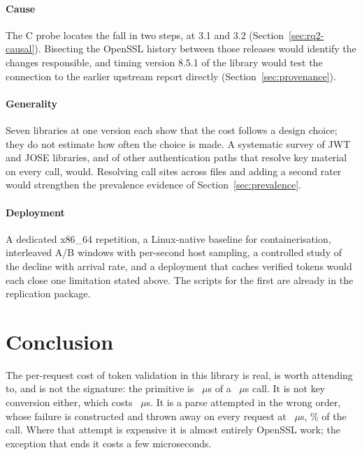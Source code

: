 \documentclass[preprint,12pt,authoryear]{elsarticle}
\begin{document}
\paragraph{Cause} The C probe locates the fall in two steps, at 3.1 and 3.2
(Section~\ref{sec:rq2-causal}). Bisecting the OpenSSL history between those
releases would identify the changes responsible, and timing version 8.5.1 of
the library would test the connection to the earlier upstream report directly
(Section~\ref{sec:provenance}).

\paragraph{Generality} Seven libraries at one version each show that the cost
follows a design choice; they do not estimate how often the choice is made. A
systematic survey of JWT and JOSE libraries, and of other authentication paths
that resolve key material on every call, would. Resolving call sites across
files and adding a second rater would strengthen the prevalence evidence of
Section~\ref{sec:prevalence}.

\paragraph{Deployment} A dedicated x86\_64 repetition, a Linux-native baseline
for containerisation, interleaved A/B windows with per-second host sampling, a
controlled study of the decline with arrival rate, and a deployment that caches
verified tokens would each close one limitation stated above. The scripts for
the first are already in the replication package.

\section{Conclusion}\label{sec:conclusion}

The per-request cost of token validation in this library is real, is worth
attending to, and is not the signature: the primitive is \HostHmacString~$\mu$s
of a \HostJwtString~$\mu$s call. It is not key conversion either, which costs
\HostCreateSecretKey~$\mu$s. It is a parse attempted in the wrong order, whose
failure is constructed and thrown away on every request at
\HostProbeThrows~$\mu$s, \HostProbeShareOfCall\% of the call. Where that attempt is expensive it is
almost entirely OpenSSL work; the exception that ends it costs a few
microseconds.
\end{document}
